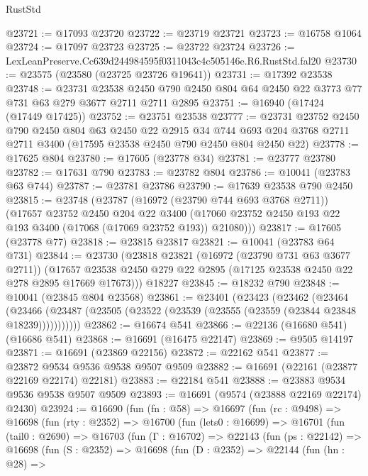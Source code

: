 \begin{lexlean}{RustStd}
\begin{coremodule}
@23721 := @17093 @23720
@23722 := @23719 @23721
@23723 := @16758 @1064
@23724 := @17097 @23723
@23725 := @23722 @23724
@23726 := LexLeanPreserve.Cc639d244984595f0311043c4c505146e.R6.RustStd.fal20
@23730 := @23575 (@23580 (@23725 @23726 @19641))
@23731 := @17392 @23538
@23748 := @23731
    @23538
    @2450
    @790
    @2450
    @804
    @64
    @2450
    @22
    @3773
    @77
    @731
    @63
    @279
    @3677
    @2711
    @2711
    @2895
@23751 := @16940 (@17424 (@17449 @17425))
@23752 := @23751 @23538
@23777 := @23731
    @23752
    @2450
    @790
    @2450
    @804
    @63
    @2450
    @22
    @2915
    @34
    @744
    @693
    @204
    @3768
    @2711
    @2711
    @3400
    (@17595 @23538 @2450 @790 @2450 @804 @2450 @22)
@23778 := @17625 @804
@23780 := @17605 (@23778 @34)
@23781 := @23777 @23780
@23782 := @17631 @790
@23783 := @23782 @804
@23786 := @10041 (@23783 @63 @744)
@23787 := @23781 @23786
@23790 := @17639 @23538 @790 @2450
@23815 := @23748
    (@23787
      (@16972 (@23790 @744 @693 @3768 @2711))
      (@17657
        @23752
        @2450
        @204
        @22
        @3400
        (@17060 @23752 @2450 @193 @22 @193 @3400 (@17068 (@17069 @23752 @193)) @21080)))
@23817 := @17605 (@23778 @77)
@23818 := @23815 @23817
@23821 := @10041 (@23783 @64 @731)
@23844 := @23730
    (@23818
      @23821
      (@16972 (@23790 @731 @63 @3677 @2711))
      (@17657 @23538 @2450 @279 @22 @2895 (@17125 @23538 @2450 @22 @278 @2895 @17669 @17673)))
    @18227
@23845 := @18232 @790
@23848 := @10041 (@23845 @804 @23568)
@23861 := @23401
    (@23423
      (@23462
        (@23464
          (@23466 (@23487 (@23505 (@23522 (@23539 (@23555 (@23559 (@23844 @23848 @18239)))))))))))
@23862 := @16674 @541
@23866 := @22136 (@16680 @541) (@16686 @541)
@23868 := @16691 (@16475 @22147)
@23869 := @9505 @14197
@23871 := @16691 (@23869 @22156)
@23872 := @22162 @541
@23877 := @23872 @9534 @9536 @9538 @9507 @9509
@23882 := @16691 (@22161 (@23877 @22169 @22174) @22181)
@23883 := @22184 @541
@23888 := @23883 @9534 @9536 @9538 @9507 @9509
@23893 := @16691 (@9574 (@23888 @22169 @22174) @2430)
@23924 := @16690
    (fun (fn : @58) =>
    @16697
      (fun (rc : @9498) =>
      @16698
        (fun (rty : @2352) =>
        @16700
          (fun (lets0 : @16699) =>
          @16701
            (fun (tail0 : @2690) =>
            @16703
              (fun (Γ : @16702) =>
              @22143
                (fun (ps : @22142) =>
                @16698
                  (fun (S : @2352) =>
                  @16698
                    (fun (D : @2352) =>
                    @22144
                      (fun (hn : @28) =>

\end{coremodule}
\end{lexlean}

